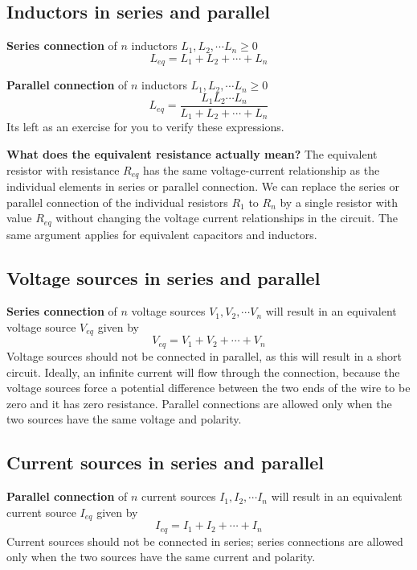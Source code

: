\subsection{Inductors in series and parallel}
\noindent\textbf{Series connection} of $n$ inductors $L_1, L_2, \cdots L_n \geq 0$
\begin{equation}
    L_{eq} = L_1 + L_2 + \cdots + L_n
    \label{eq:02-17}
\end{equation}

\noindent\textbf{Parallel connection} of $n$ inductors $L_1, L_2, \cdots L_n \geq 0$
\begin{equation}
    L_{eq} = \frac{L_1L_2\cdots L_n}{L_1 + L_2 + \cdots + L_n}
    \label{eq:02-18}
\end{equation}
Its left as an exercise for you to verify these expressions.

\noindent\textbf{What does the equivalent resistance actually mean?} The equivalent resistor with resistance $R_{eq}$ has the same voltage-current relationship as the individual elements in series or parallel connection. We can replace the series or parallel connection of the individual resistors $R_1$ to $R_n$ by a single resistor with value $R_{eq}$ without changing the voltage current relationships in the circuit. The same argument applies for equivalent capacitors and inductors.

\subsection{Voltage sources in series and parallel}
\noindent\textbf{Series connection} of $n$ voltage sources $V_1, V_2, \cdots V_n$ will result in an equivalent voltage source $V_{eq}$ given by
\begin{equation}
    V_{eq} = V_1 + V_2 + \cdots + V_n
    \label{eq:02-19}
\end{equation}
Voltage sources should not be connected in parallel, as this will result in a short circuit. Ideally, an infinite current will flow through the connection, because the voltage sources force a potential difference between the two ends of the wire to be zero and it has zero resistance. Parallel connections are allowed only when the two sources have the same voltage and polarity.

\subsection{Current sources in series and parallel}
\noindent\textbf{Parallel connection} of $n$ current sources $I_1, I_2, \cdots I_n$ will
result in an equivalent current source $I_{eq}$ given by
\begin{equation}
    I_{eq} = I_1 + I_2 + \cdots + I_n
    \label{eq:02-20}
\end{equation}
Current sources should not be connected in series; series connections are allowed only when the two sources have the same current and polarity.

